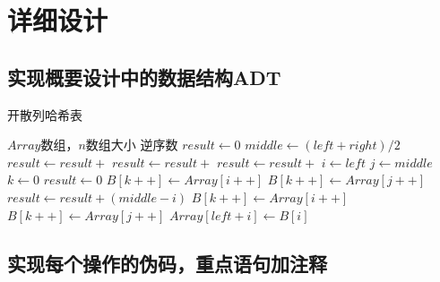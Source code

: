 \documentclass[a4paper]{article}
\begin{document}
    \section{详细设计}\label{sec:design2}

    \subsection{实现概要设计中的数据结构ADT}\label{subsec:adt2}
    \begin{algorithm}
        \caption{开散列哈希表}
        \begin{algorithmic}[1] %
            \Require $Array$数组，$n$数组大小
            \Ensure 逆序数
                \State $result \gets 0$
                    \State $middle \gets (left + right) / 2$
                    \State $result \gets result +$ 
                    \State $result \gets result +$ 
                    \State $result \gets result +$ 
                \EndIf
                \State {}
            \EndFunction
            \State
                \State $i\gets left$
                \State $j\gets middle$
                \State $k\gets 0$
                \State $result \gets 0$
                        \State $B[k++]\gets Array[i++]$
                    \Else
                        \State $B[k++] \gets Array[j++]$
                        \State $result \gets result + (middle - i)$
                    \EndIf
                \EndWhile
                    \State $B[k++] \gets Array[i++]$
                \EndWhile
                    \State $B[k++] \gets Array[j++]$
                \EndWhile
                    \State $Array[left + i] \gets B[i]$
                \EndFor
                \State {}
            \EndFunction
        \end{algorithmic}\label{alg:algorithm2}
    \end{algorithm}

    \subsection{实现每个操作的伪码，重点语句加注释}\label{subsec:explain}
\end{document}

